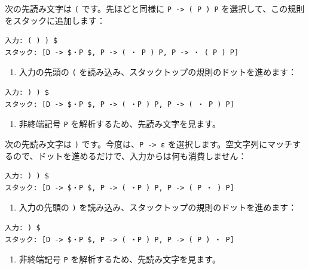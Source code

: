 次の先読み文字は \texttt{(} です。先ほどと同様に
\texttt{P\ -\textgreater{}\ (\ P\ )\ P}
を選択して、この規則をスタックに追加します：

\begin{verbatim}
入力: ( ) ) $
スタック: [D -> $・P $, P -> ( ・ P ) P, P -> ・ ( P ) P]
\end{verbatim}

\begin{enumerate}
\def\labelenumi{\arabic{enumi}.}
\setcounter{enumi}{4}
\tightlist
\item
  入力の先頭の \texttt{(}
  を読み込み、スタックトップの規則のドットを進めます：
\end{enumerate}

\begin{verbatim}
入力: ) ) $
スタック: [D -> $・P $, P -> ( ・P ) P, P -> ( ・ P ) P]
\end{verbatim}

\begin{enumerate}
\def\labelenumi{\arabic{enumi}.}
\setcounter{enumi}{5}
\tightlist
\item
  非終端記号 \texttt{P} を解析するため、先読み文字を見ます。
\end{enumerate}

次の先読み文字は \texttt{)} です。今度は、\texttt{P\ -\textgreater{}\ ε}
を選択します。空文字列にマッチするので、ドットを進めるだけで、入力からは何も消費しません：

\begin{verbatim}
入力: ) ) $
スタック: [D -> $・P $, P -> ( ・P ) P, P -> ( P ・ ) P]
\end{verbatim}

\begin{enumerate}
\def\labelenumi{\arabic{enumi}.}
\setcounter{enumi}{6}
\tightlist
\item
  入力の先頭の \texttt{)}
  を読み込み、スタックトップの規則のドットを進めます：
\end{enumerate}

\begin{verbatim}
入力: ) $
スタック: [D -> $・P $, P -> ( ・P ) P, P -> ( P ) ・ P]
\end{verbatim}

\begin{enumerate}
\def\labelenumi{\arabic{enumi}.}
\setcounter{enumi}{7}
\tightlist
\item
  非終端記号 \texttt{P} を解析するため、先読み文字を見ます。
\end{enumerate}

